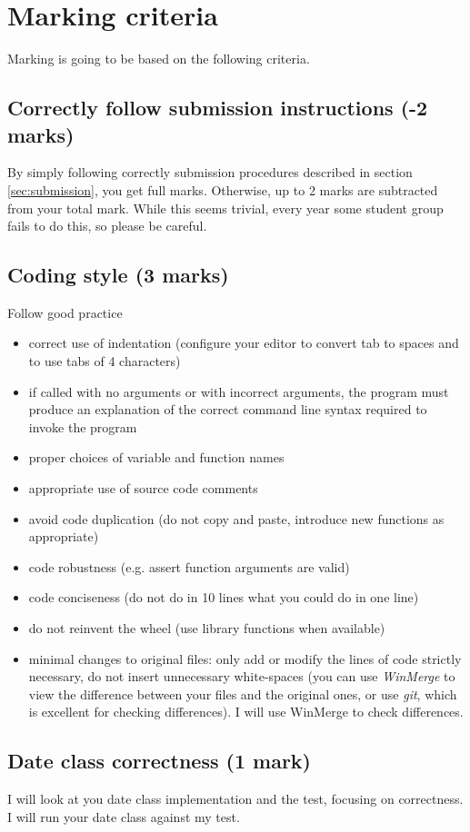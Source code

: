 \documentclass[10pt]{article}
\begin{document}
\section{Marking criteria}
Marking is going to be based on the following criteria.
\subsection{Correctly follow submission instructions (-2 marks)}
By simply following correctly submission procedures described in section \ref{sec:submission}, you get full marks. Otherwise, up to 2 marks are subtracted from your total mark. While this seems trivial, every year some student group fails to do this, so please be careful. 
\subsection{Coding style (3 marks)}
Follow good practice
\begin{itemize}
\item correct use of indentation (configure your editor to convert tab to spaces and to use tabs of 4 characters)
\item if called with no arguments or with incorrect arguments, the program must produce an explanation of the correct command line syntax required to invoke the program
\item proper choices of variable and function names
\item appropriate use of source code comments
\item avoid code duplication (do not copy and paste, introduce new functions as appropriate)
\item code robustness (e.g. assert function arguments are valid)
\item code conciseness (do not do in 10 lines what you could do in one line)
\item do not reinvent the wheel (use library functions when available)
\item minimal changes to original files: only add or modify the lines of code strictly necessary, do not insert unnecessary white-spaces (you can use \textit{WinMerge} to view the difference between your files and the original ones, or use \textit{git}, which is excellent for checking differences). I will use WinMerge to check differences.
\end{itemize}

\subsection{Date class correctness (1 mark)}
I will look at you date class implementation and the test, focusing on correctness. I will run your date class against my test.
\end{document}
